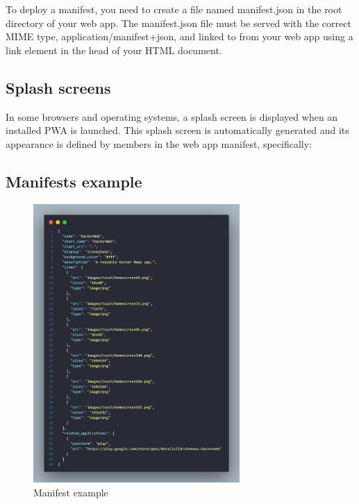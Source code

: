 \documentclass[12pt,a4paper, twosite]{article}
\begin{document}
To deploy a manifest, you need to create a file named manifest.json in the root directory of your web app. The manifest.json file must be served with the correct MIME type, application/manifest+json, and linked to from your web app using a link element in the head of your HTML document.


\subsection{Splash screens}

In some browsers and operating systems, a splash screen is displayed when an installed PWA is launched. This splash screen is automatically generated and its appearance is defined by members in the web app manifest, specifically:

\subsection{Manifests example}
\label{sec:org2498090}

\begin{figure}
  \begin{centering}
  \includegraphics[width=0.7\textwidth]{img/1.png}
  \caption{Manifest example}
  \label{subd3} 
  \end{centering}
\end{figure}
\end{document}

